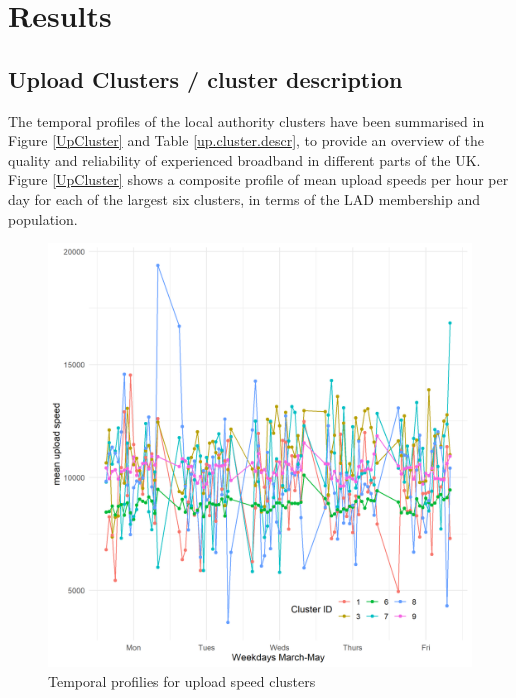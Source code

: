 \documentclass[]{interact}
\theoremstyle{plain}%
\theoremstyle{definition}
\theoremstyle{remark}
\begin{document}
\hypertarget{sec:4}{%
\section{Results}\label{sec:4}}

\hypertarget{sec:4.1}{%
\subsection{Upload Clusters / cluster description}\label{sec:4.1}}

The temporal profiles of the local authority clusters have been
summarised in Figure \ref{UpCluster} and Table \ref{up.cluster.descr},
to provide an overview of the quality and reliability of experienced
broadband in different parts of the UK. Figure \ref{UpCluster} shows a
composite profile of mean upload speeds per hour per day for each of the
largest six clusters, in terms of the LAD membership and population.

\begin{figure}
\includegraphics[width=0.95\linewidth]{figures/UpCluster} \caption{\label{UpCluster}Temporal profilies for upload speed clusters}\label{fig:unnamed-chunk-2}
\end{figure}
\end{document}
